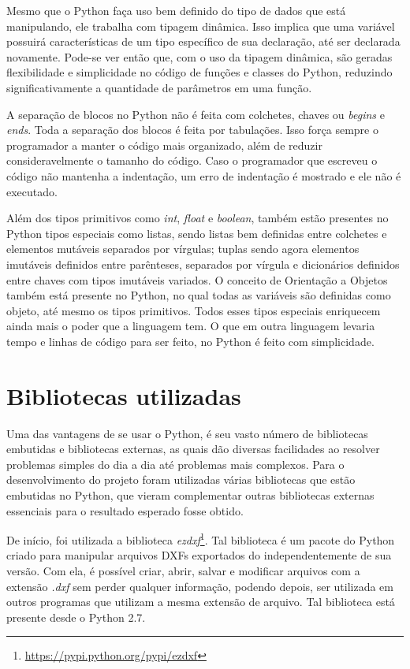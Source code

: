 \documentclass[
	12pt,				%
	openright,			%
	twoside,			%
	a4paper,			%
	english,			%
	french,				%
	spanish,			%
	brazil				%
	]{abntex2}
\begin{document}
Mesmo que o Python faça uso bem definido do tipo de dados que está manipulando, ele trabalha com tipagem dinâmica. Isso implica que uma variável possuirá características de um tipo específico de sua declaração, até ser declarada novamente. Pode-se ver então que, com o uso da tipagem dinâmica, são geradas flexibilidade e simplicidade no código de funções e classes do Python, reduzindo significativamente a quantidade de parâmetros em uma função.

A separação de blocos no Python não é feita com colchetes, chaves ou \textit{begins} e \textit{ends}. Toda a separação dos blocos é feita por tabulações. Isso força sempre o programador a manter o código mais organizado, além de reduzir consideravelmente o tamanho do código. Caso o programador que escreveu o código não mantenha a indentação, um erro de indentação é mostrado e ele não é executado.

Além dos tipos primitivos como \textit{int}, \textit{float} e \textit{boolean}, também estão presentes no Python tipos especiais como listas, sendo listas bem definidas entre colchetes e elementos mutáveis separados por vírgulas; tuplas sendo agora elementos imutáveis definidos entre parênteses, separados por vírgula e dicionários definidos entre chaves com tipos imutáveis variados. O conceito de Orientação a Objetos também está presente no Python, no qual todas as variáveis são definidas como objeto, até mesmo os tipos primitivos. Todos esses tipos especiais enriquecem ainda mais o poder que a linguagem tem. O que em outra linguagem levaria tempo e linhas de código para ser feito, no Python é feito com simplicidade.


\section[Bibliotecas utilizadas]{Bibliotecas utilizadas}

Uma das vantagens de se usar o Python, é seu vasto número de bibliotecas embutidas e bibliotecas externas, as quais dão diversas facilidades ao resolver problemas simples do dia a dia até problemas mais complexos. Para o desenvolvimento do projeto foram utilizadas várias bibliotecas que estão embutidas no Python, que vieram complementar outras bibliotecas externas essenciais para o resultado esperado fosse obtido. 

De início, foi utilizada a biblioteca \textit{ezdxf}\footnote{\url{https://pypi.python.org/pypi/ezdxf}}. Tal biblioteca é um pacote do Python criado para manipular arquivos DXFs exportados do \textit{} independentemente de sua versão. Com ela, é possível criar, abrir, salvar e modificar arquivos com a extensão \textit{.dxf} sem perder qualquer informação, podendo depois, ser utilizada em outros programas que utilizam a mesma extensão de arquivo. Tal biblioteca está presente desde o Python 2.7.
\end{document}
